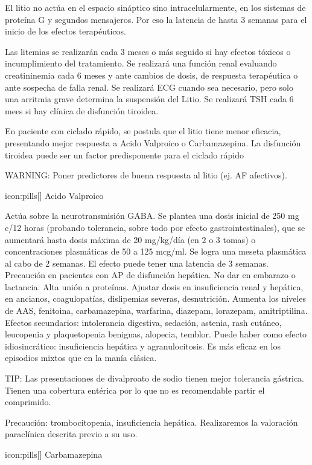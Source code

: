 \documentclass[encares.tex]{subfiles}
\begin{document}
El litio no actúa en el espacio sináptico sino intracelularmente, en los sistemas de proteína G y segundos mensajeros. Por eso la latencia de hasta 3 semanas para el inicio de los efectos terapéuticos.

Las litemias se realizarán cada 3 meses o más seguido si hay efectos tóxicos o incumplimiento del tratamiento. Se realizará una función renal evaluando creatininemia cada 6 meses y ante cambios de dosis, de respuesta terapéutica o ante sospecha de falla renal. Se realizará ECG cuando sea necesario, pero solo una arritmia grave determina la suspensión del Litio. Se realizará TSH cada 6 mees si hay clínica de disfunción tiroidea.

En paciente con ciclado rápido, se postula que el litio tiene menor eficacia, presentando mejor respuesta a Acido Valproico o Carbamazepina. La disfunción tiroidea puede ser un factor predisponente para el ciclado rápido


WARNING: Poner predictores de buena respuesta al litio (ej. AF afectivos).

icon:pills[] Acido Valproico

Actúa sobre la neurotransmisión GABA. Se plantea una dosis inicial de 250 mg c/12 horas (probando tolerancia, sobre todo por efecto gastrointestinales), que se aumentará hasta dosis máxima de 20 mg/kg/día (en 2 o 3 tomas) o concentraciones plasmáticas de 50 a 125 mcg/ml. Se logra una meseta plasmática al cabo de 2 semanas. El efecto puede tener una latencia de 3 semanas. Precaución en pacientes con AP de disfunción hepática. No dar en embarazo o lactancia. Alta unión a proteínas. Ajustar dosis en insuficiencia renal y hepática, en ancianos, coagulopatías, dislipemias severas, desnutrición. Aumenta los niveles de AAS, fenitoina, carbamazepina, warfarina, diazepam, lorazepam, amitriptilina. Efectos secundarios: intolerancia digestiva, sedación, astenia, rash cutáneo, leucopenia y plaquetopenia benignas, alopecia, temblor. Puede haber como efecto idiosincrático: insuficiencia hepática y agranulocitosis.
Es más eficaz en los episodios mixtos que en la manía clásica.

TIP: Las presentaciones de divalproato de sodio tienen mejor tolerancia gástrica. Tienen una cobertura entérica por lo que no es recomendable partir el comprimido.

Precaución: trombocitopenia, insuficiencia hepática. Realizaremos la valoración paraclínica descrita previo a su uso.

icon:pills[] Carbamazepina
\end{document}

